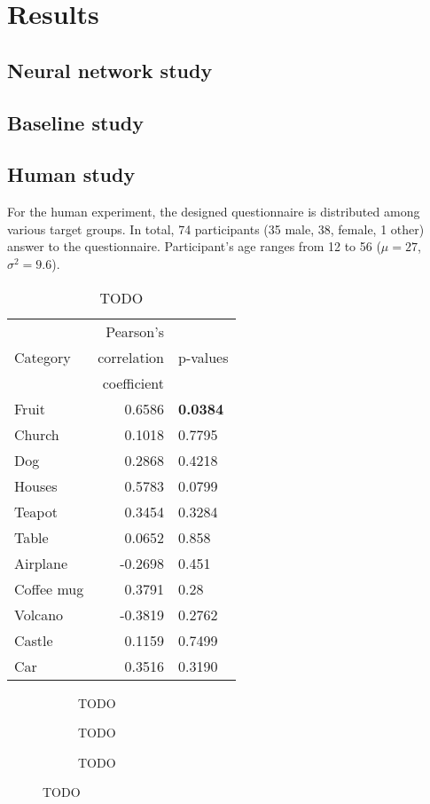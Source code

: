 \documentclass[10pt,a4paper,twocolumn]{article}
\begin{document}
\section*{Results}
\subsection*{Neural network study}
\subsection*{Baseline study}
\subsection*{Human study}
For the human experiment, the designed questionnaire is distributed among various target groups. In total, 74 participants (35 male, 38, female, 1 other) answer to the questionnaire. Participant's age ranges from 12 to 56 ($\mu=27$, $\sigma^2=9.6$).

\begin{table}[ht]
\begin{center}
\begin{tabular}{l r l}
\multirow{3}{*}{Category} & Pearson's & \multirow{3}{*}{p-values} \\
 & correlation &   \\
 & coefficient &  \\
\hline
Fruit & 0.6586 & \textbf{0.0384} \\
Church & 0.1018 & 0.7795 \\
Dog & 0.2868 & 0.4218 \\
Houses & 0.5783 & 0.0799 \\
Teapot & 0.3454 & 0.3284 \\
Table & 0.0652 & 0.858 \\
Airplane & -0.2698 & 0.451 \\
Coffee mug & 0.3791 & 0.28 \\
Volcano & -0.3819 & 0.2762 \\
Castle & 0.1159 & 0.7499 \\
Car & 0.3516 & 0.3190\\
\end{tabular}
\end{center}
\caption{TODO}
\label{tab:pearsons}
\end{table}

\begin{figure*}
\begin{center}
\begin{subfigure}[t]
\texttt{[image: fruit\_hist.pdf]}
\caption{TODO}
\end{subfigure}
\begin{subfigure}[t]
\texttt{[image: volcano\_hist.pdf]}
\caption{TODO}
\end{subfigure}
\hfill
\begin{subfigure}[t]
\texttt{[image: table\_hist.pdf]}
\caption{TODO}
\end{subfigure}
\end{center}
\caption{TODO}
\label{fig:fruit_hist}
\end{figure*}
                        
\end{document}
